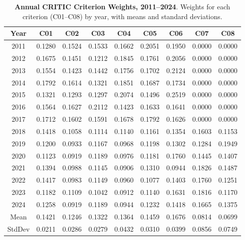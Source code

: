 \begin{table}[H]
\centering
\caption{\textbf{Annual CRITIC Criterion Weights, 2011--2024}. Weights for each criterion (C01--C08) by year, with means and standard deviations.}
\label{tab:annual-critic-weights}
\small
\begin{tabular}{ccccccccc}
\toprule
\textbf{Year} & \textbf{C01} & \textbf{C02} & \textbf{C03} & \textbf{C04} & \textbf{C05} & \textbf{C06} & \textbf{C07} & \textbf{C08} \\
\midrule
2011 & 0.1280 & 0.1524 & 0.1533 & 0.1662 & 0.2051 & 0.1950 & 0.0000 & 0.0000 \\
2012 & 0.1675 & 0.1451 & 0.1212 & 0.1845 & 0.1761 & 0.2056 & 0.0000 & 0.0000 \\
2013 & 0.1554 & 0.1423 & 0.1442 & 0.1756 & 0.1702 & 0.2124 & 0.0000 & 0.0000 \\
2014 & 0.1792 & 0.1614 & 0.1321 & 0.1851 & 0.1687 & 0.1734 & 0.0000 & 0.0000 \\
2015 & 0.1321 & 0.1293 & 0.1297 & 0.2074 & 0.1496 & 0.2519 & 0.0000 & 0.0000 \\
2016 & 0.1564 & 0.1627 & 0.2112 & 0.1423 & 0.1633 & 0.1641 & 0.0000 & 0.0000 \\
2017 & 0.1712 & 0.1602 & 0.1591 & 0.1678 & 0.1792 & 0.1626 & 0.0000 & 0.0000 \\
2018 & 0.1418 & 0.1058 & 0.1114 & 0.1140 & 0.1161 & 0.1354 & 0.1603 & 0.1153 \\
2019 & 0.1200 & 0.0933 & 0.1167 & 0.0968 & 0.1198 & 0.1302 & 0.1284 & 0.1949 \\
2020 & 0.1123 & 0.0919 & 0.1189 & 0.0976 & 0.1181 & 0.1760 & 0.1445 & 0.1407 \\
2021 & 0.1394 & 0.0988 & 0.1145 & 0.0906 & 0.1310 & 0.0944 & 0.1826 & 0.1487 \\
2022 & 0.1417 & 0.0983 & 0.1149 & 0.0960 & 0.1077 & 0.1403 & 0.1760 & 0.1251 \\
2023 & 0.1182 & 0.1109 & 0.1042 & 0.0912 & 0.1140 & 0.1631 & 0.1816 & 0.1170 \\
2024 & 0.1258 & 0.0919 & 0.1189 & 0.0944 & 0.1232 & 0.1418 & 0.1665 & 0.1375 \\
\midrule
Mean   & 0.1421 & 0.1246 & 0.1322 & 0.1364 & 0.1459 & 0.1676 & 0.0814 & 0.0699 \\
StdDev & 0.0211 & 0.0286 & 0.0279 & 0.0432 & 0.0310 & 0.0399 & 0.0856 & 0.0749 \\
\bottomrule
\end{tabular}
\end{table}
